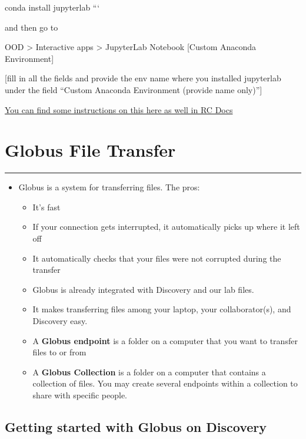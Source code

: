 \documentclass[
  letterpaper,
  DIV=11,
  numbers=noendperiod]{scrreprt}
\begin{document}
conda install jupyterlab ```

and then go to

OOD \textgreater{} Interactive apps \textgreater{} JupyterLab Notebook
{[}Custom Anaconda Environment{]}

{[}fill in all the fields and provide the env name where you installed
jupyterlab under the field ``Custom Anaconda Environment (provide name
only)''{]}

\href{https://rc-docs.northeastern.edu/en/latest/using-ood/interactiveapps.html\#working-with-jupyter-notebook-custom-anaconda-environment}{You
can find some instructions on this here as well in RC Docs}

\hypertarget{globus-file-transfer}{%
\chapter{Globus File Transfer}\label{globus-file-transfer}}

\begin{center}\rule{0.5\linewidth}{0.5pt}\end{center}

\begin{itemize}
\item
  Globus is a system for transferring files. The pros:

  \begin{itemize}
  \item
    It's fast
  \item
    If your connection gets interrupted, it automatically picks up where
    it left off
  \item
    It automatically checks that your files were not corrupted during
    the transfer
  \item
    Globus is already integrated with Discovery and our lab files.
  \item
    It makes transferring files among your laptop, your collaborator(s),
    and Discovery easy.
  \item
    A \textbf{Globus endpoint} is a folder on a computer that you want
    to transfer files to or from
  \item
    A \textbf{Globus Collection} is a folder on a computer that contains
    a collection of files. You may create several endpoints within a
    collection to share with specific people.
  \end{itemize}
\end{itemize}

\hypertarget{getting-started-with-globus-on-discovery}{%
\section*{\texorpdfstring{\textbf{Getting started with Globus on
Discovery}}{Getting started with Globus on Discovery}}\label{getting-started-with-globus-on-discovery}}
\end{document}
